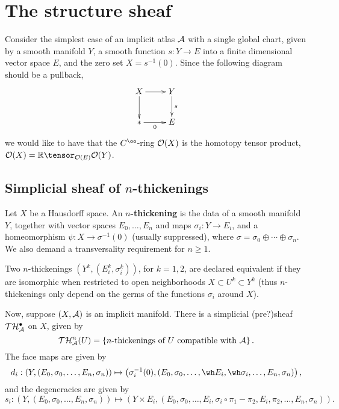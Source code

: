
\section{The structure sheaf}

Consider the simplest case of an implicit atlas $\mathcal A$ with a single global chart, given by a smooth manifold $Y$, a smooth function $s: Y \to E$ into a finite dimensional vector space $E$, and the zero set $X = s^{-1}(0)$. Since the following diagram should be a pullback,
\[ \xymatrix{X \ar[r] \ar[d] & Y \ar[d]^-{s} \\ {*} \ar[r]_-{0} & E}\]
we would like to have that the $C^\oo$-ring $\mathcal O(X)$ is the homotopy tensor product, $\cO(X) = \RR \tensor_{\cO(E)} \cO(Y)$.

\subsection{Simplicial sheaf of $n$-thickenings}

\begin{defn}\label{n-thickening}
Let $X$ be a Hausdorff space. An {\bf $n$-thickening} is the data of a smooth manifold $Y$, together with vector spaces $E_0, \dots, E_n$ and maps $\sigma_i: Y \to E_i$, and a homeomorphism $\psi: X \to \sigma^{-1}(0)$ (usually suppressed), where $\sigma = \sigma_0 \oplus \cdots \oplus \sigma_n$. We also demand a transversality requirement for $n \geq 1$. 

Two $n$-thickenings $(Y^k, (E_i^k, \sigma_i^k))$, for $k = 1, 2$, are declared equivalent if they are isomorphic when restricted to open neighborhoods $X \subset U^k \subset Y^k$ (thus $n$-thickenings only depend on the germs of the functions $\sigma_i$ around $X$).
\end{defn}

Now, suppose $(X, \mathcal A)$ is an implicit manifold.  There is a simplicial (pre?)sheaf $\mathcal T \mathcal H_\mathcal A^\bullet$ on $X$, given by
\[ \mathcal T \mathcal H_\mathcal A^n(U) = \left\{ \text{$n$-thickenings of $U$ compatible with $\mathcal A$} \right\}. \]
The face maps are given by
\[ d_i : \left( Y, (E_0, \sigma_0, \dots, E_n, \sigma_n) \right) \mapsto \left( \sigma_i^{-1}(0), (E_0, \sigma_0, \dots, \wh E_i, \wh \sigma_i, \dots , E_n, \sigma_n) \right), \]
and the degeneracies are given by
\[ s_i : \left( Y, (E_0, \sigma_0, \dots, E_n, \sigma_n) \right) \mapsto \left( Y \times E_i, (E_0, \sigma_0, \dots, E_i, \sigma_i \circ \pi_1 - \pi_2, E_i, \pi_2, \dots, E_n, \sigma_n) \right). \]

